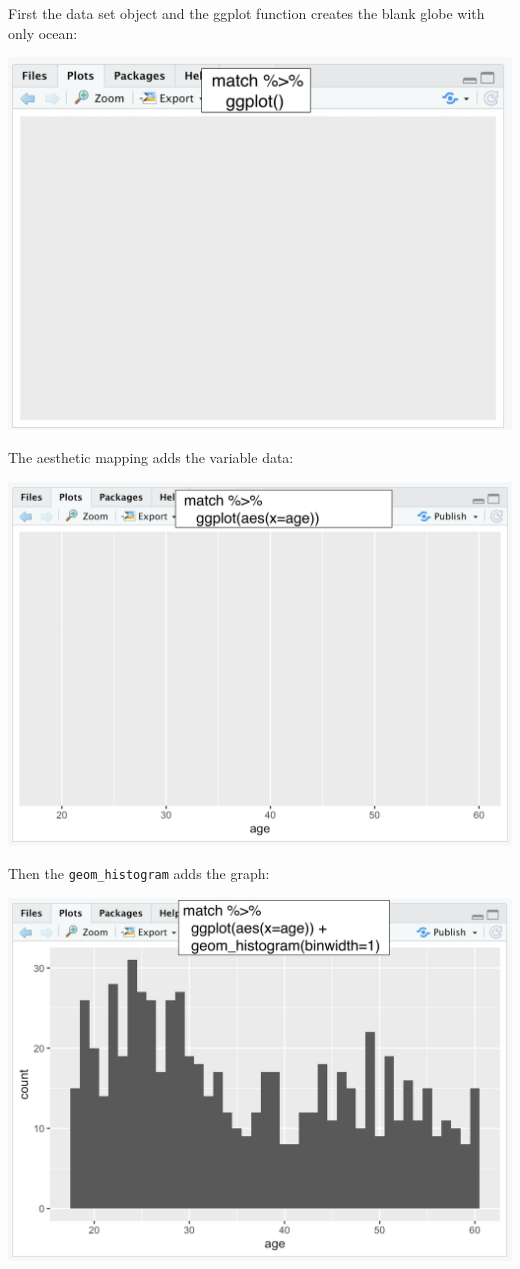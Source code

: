 \documentclass[
]{book}
\begin{document}
First the data set object and the ggplot function creates the blank globe with only ocean:

\includegraphics{img/2R.8.png}

The aesthetic mapping adds the variable data:

\includegraphics{img/2R.9.png}

Then the \texttt{geom\_histogram} adds the graph:

\includegraphics{img/2R.10.png}
\end{document}
